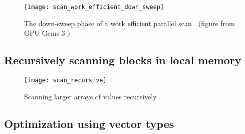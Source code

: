 \begin{figure}
\centering
\texttt{[image: scan\_work\_efficient\_down\_sweep]}
\caption{The down-sweep phase of a work efficient parallel scan \cite{scan_blelloch}.  (figure from GPU Gems 3 \cite{gpu_gems_3_chapter_39})}
\label{fig:scan_work_efficient_down_sweep}
\end{figure}





\subsection{Recursively scanning blocks in local memory}

\begin{figure}
\centering
\texttt{[image: scan\_recursive]}
\caption{Scanning larger arrays of values recursively \cite{gpu_gems_3_chapter_39}.}
\label{fig:scan_recursive}
\end{figure}





\subsection{Optimization using vector types}



